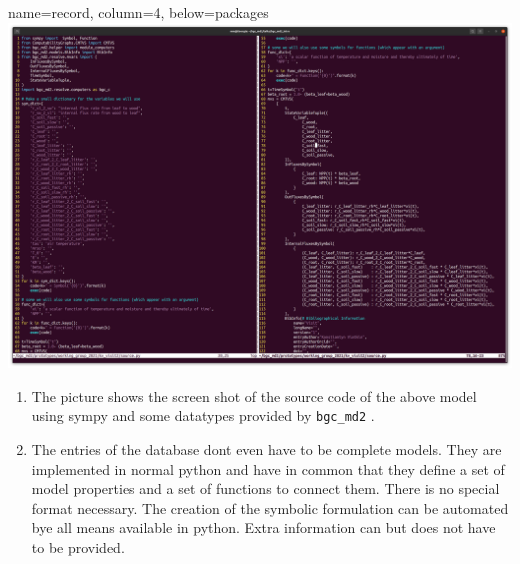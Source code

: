 \documentclass[36pt]{article}
\begin{document}
\begin{tcbposter}
\begin{posterboxenv}[adjusted title=A record]
  {
  name=record,
  column=4,
  below=packages
}
  \includegraphics[width=\columnwidth]{source.py.png}
  \begin{enumerate}
    \item
    The picture shows the screen shot of the source code of the above model using sympy and some datatypes provided by \texttt{bgc\_md2}  .
    \item
    The entries of the database dont even have to be complete models. They are implemented in normal python and 
    have in common that they define a set of model properties and a set of functions to connect them.
    There is no special format necessary. 
    The creation of the symbolic formulation can be automated bye all means available in python.
    Extra information can but does not have to be provided.
  \end{enumerate}
\end{posterboxenv}
\end{tcbposter}
\end{document}
